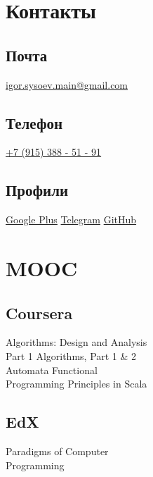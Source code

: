\documentclass[a4paper]{curricula-vitae}
\begin{document}
\begin{minipage}[t]{0.33\textwidth}%

\section{Контакты} 

\subsection{Почта}
\href{mailto:igor.sysoev.main@gmail.com}{igor.sysoev.main@gmail.com}

\insertspace

\subsection{Телефон}
\href{tel:+79153885191}{+7 (915) 388 - 51 - 91}

\insertspace

\subsection{Профили}
\href{https://plus.google.com/+%D0%98%D0%B3%D0%BE%D1%80%D1%8C%D0%A1%D1%8B%D1%81%D0%BE%D0%B5%D0%B2}{Google Plus}
\textbullet{} \href{https://t.me/hoholic}{Telegram}
\textbullet{} \href{https://github.com/ho-holic}{GitHub}

\insertspace

\section{MOOC}

\subsection{Coursera}
Algorithms: Design and Analysis \\
Part 1 \textbullet{} Algorithms, Part 1 \& 2 \\ 
Automata \textbullet{} Functional \\
Programming Principles in Scala

\insertspace

\subsection{EdX}
Paradigms of Computer \\
Programming


\end{minipage}
\end{document}
